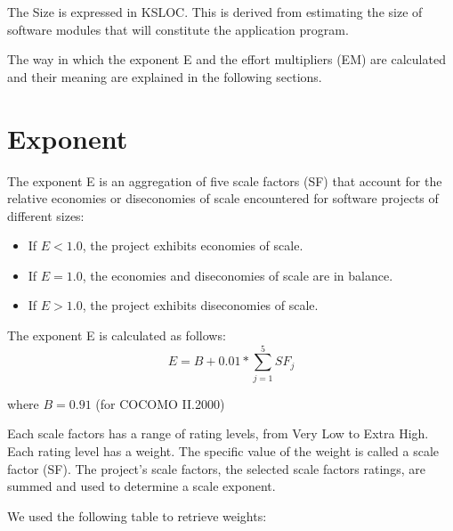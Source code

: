 \documentclass[10pt,a4paper,titlepage]{article}
\begin{document}
The Size is expressed in KSLOC. This is derived from estimating the size of software modules that will constitute the application program.  
 
The way in which the exponent E and the effort multipliers (EM) are calculated and their meaning are explained in the following sections. 

\section{Exponent}
The exponent E is an aggregation of five scale factors (SF) that account for the relative economies or diseconomies of scale encountered for software projects of different sizes:
\begin{itemize}
\item If $E < 1.0$, the project exhibits economies of scale.
\item If $E = 1.0$, the economies and diseconomies of scale are in balance.
\item If $E > 1.0$, the project exhibits diseconomies of scale.
\end{itemize}

The exponent E is calculated as follows:
\[E = B + 0.01 * \sum\limits_{j=1}^5{SF_j}\]
\begin{center}
where $B=0.91$ (for COCOMO II.2000)
\end{center}

Each scale factors has a range of rating levels, from Very Low to Extra High. Each rating level has a weight. The specific value of the weight is called a scale factor (SF). The project's scale factors, the selected scale factors ratings, are summed and used to determine a scale exponent.

We used the following table to retrieve weights:
\end{document}
